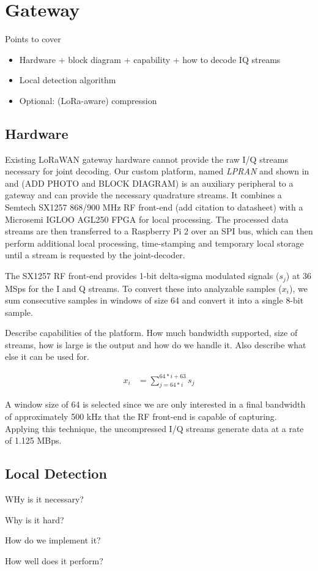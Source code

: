 \section{Gateway}
\label{sec:gateway}

{\color{blue} Points to cover
\begin{itemize}
    \item Hardware + block diagram + capability + how to decode IQ streams
    \item Local detection algorithm
    \item Optional: (LoRa-aware) compression
\end{itemize}

}

\subsection{Hardware}
\label{sec:hardware}

Existing LoRaWAN gateway hardware cannot provide the raw I/Q streams necessary
for joint decoding. Our custom platform, named \textit{LPRAN} and shown in
 and  {\color{blue} (ADD PHOTO and
BLOCK DIAGRAM)} is an auxiliary peripheral to a gateway and can provide the
necessary quadrature streams. It combines a Semtech SX1257 868/900 MHz RF
front-end {\color{blue} (add citation to datasheet)} with a Microsemi IGLOO
AGL250 FPGA for local processing. The processed data streams are then
transferred to a Raspberry Pi 2 over an SPI bus, which can then perform
additional local processing, time-stamping and temporary local storage until a
stream is requested by the joint-decoder.

The SX1257 RF front-end provides 1-bit delta-sigma modulated signals ($s_j$)
at 36 MSps for the I and Q streams. To convert these into analyzable samples
($x_i$), we sum consecutive samples in windows of size 64 and convert it into
a single 8-bit sample.

{\color{blue} Describe capabilities of the platform. How much bandwidth supported, size of streams, how is large is the output and how do we handle it. Also describe what else it can be used for.}

\begin{align*}
x_i &= \sum_{j=64*i}^{64*i + 63} s_j
\end{align*}

A window size of 64 is selected since we are only interested in a final
bandwidth of approximately 500 kHz that the RF front-end is capable of
capturing. Applying this technique, the uncompressed I/Q streams generate data
at a rate of 1.125 MBps.

\subsection{Local Detection}
\label{sec:local-detection}

WHy is it necessary?

Why is it hard?

How do we implement it?

How well does it perform?